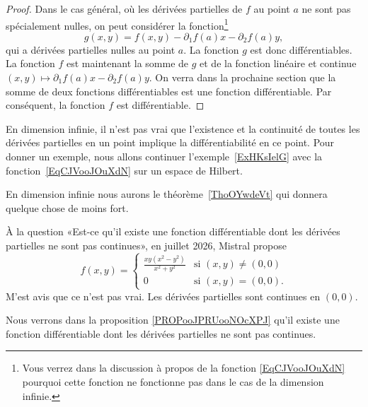 \begin{proof}
	Dans le cas général, où les dérivées partielles de \( f\) au point \( a\) ne sont pas spécialement nulles, on peut considérer la fonction\footnote{Vous verrez dans la discussion à propos de la fonction \eqref{EqCJVooJOuXdN} pourquoi cette fonction ne fonctionne pas dans le cas de la dimension infinie.}
	\begin{equation}    \label{EqXHVooJeQKrB}
		g(x,y)=f(x,y)-\partial_1 f(a)x-\partial_2 f(a)y,
	\end{equation}
	qui a dérivées partielles nulles au point \( a\). La fonction \( g\) est donc différentiables. La fonction \( f\) est maintenant la somme de \( g\) et de la fonction linéaire et continue \( (x,y)\mapsto \partial_1 f(a)x-\partial_2 f(a)y\). On verra dans la prochaine section que la somme de deux fonctions différentiables est une fonction différentiable. Par conséquent, la fonction \( f\) est différentiable.
\end{proof}

\begin{remark}
	En dimension infinie, il n'est pas vrai que l'existence et la continuité de toutes les dérivées partielles en un point implique la différentiabilité en ce point. Pour donner un exemple, nous allons continuer l'exemple~\ref{ExHKsIelG}
	avec la fonction~\ref{EqCJVooJOuXdN} sur un espace de Hilbert.

	En dimension infinie nous aurons le théorème~\ref{ThoOYwdeVt} qui donnera quelque chose de moins fort.
\end{remark}

\begin{normaltext}
	À la question «Est-ce qu'il existe une fonction différentiable dont les dérivées partielles ne sont pas continues», en juillet 2026, Mistral propose
	\begin{equation}
		f(x,y)=\begin{cases}
			\frac{ xy(x^2-y^2) }{x^2+y^2  } & \text{si } (x,y)\neq(0,0) \\
			0                               & \text{si } (x,y)=(0,0).
		\end{cases}
	\end{equation}
	M'est avis que ce n'est pas vrai. Les dérivées partielles sont continues en \( (0,0)\).
\end{normaltext}

Nous verrons dans la proposition \ref{PROPooJPRUooNOcXPJ} qu'il existe une fonction différentiable dont les dérivées partielles ne sont pas continues.



